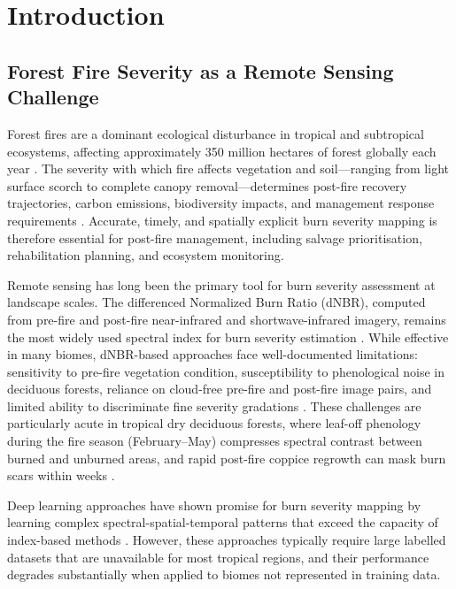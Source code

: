 \documentclass[review,12pt]{elsarticle}
\begin{document}
\linenumbers

\section{Introduction}
\label{sec:intro}

\subsection{Forest Fire Severity as a Remote Sensing Challenge}

Forest fires are a dominant ecological disturbance in tropical and subtropical ecosystems, affecting approximately 350 million hectares of forest globally each year \citep{giglio2018}. The severity with which fire affects vegetation and soil---ranging from light surface scorch to complete canopy removal---determines post-fire recovery trajectories, carbon emissions, biodiversity impacts, and management response requirements \citep{key2006,lentile2006}. Accurate, timely, and spatially explicit burn severity mapping is therefore essential for post-fire management, including salvage prioritisation, rehabilitation planning, and ecosystem monitoring.

Remote sensing has long been the primary tool for burn severity assessment at landscape scales. The differenced Normalized Burn Ratio (dNBR), computed from pre-fire and post-fire near-infrared and shortwave-infrared imagery, remains the most widely used spectral index for burn severity estimation \citep{key2006,miller2007}. While effective in many biomes, dNBR-based approaches face well-documented limitations: sensitivity to pre-fire vegetation condition, susceptibility to phenological noise in deciduous forests, reliance on cloud-free pre-fire and post-fire image pairs, and limited ability to discriminate fine severity gradations \citep{french2008,parks2014}. These challenges are particularly acute in tropical dry deciduous forests, where leaf-off phenology during the fire season (February--May) compresses spectral contrast between burned and unburned areas, and rapid post-fire coppice regrowth can mask burn scars within weeks \citep{roy2008}.

Deep learning approaches have shown promise for burn severity mapping by learning complex spectral-spatial-temporal patterns that exceed the capacity of index-based methods \citep{knopp2020,hu2021,seydi2022}. However, these approaches typically require large labelled datasets that are unavailable for most tropical regions, and their performance degrades substantially when applied to biomes not represented in training data.
\end{document}
